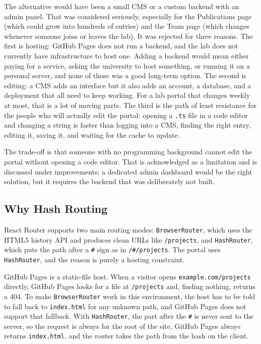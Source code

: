 The alternative would have been a small CMS or a custom backend with an admin panel. That was considered seriously, especially for the Publications page (which could grow into hundreds of entries) and the Team page (which changes whenever someone joins or leaves the lab). It was rejected for three reasons. The first is hosting: GitHub Pages does not run a backend, and the lab does not currently have infrastructure to host one. Adding a backend would mean either paying for a service, asking the university to host something, or running it on a personal server, and none of those was a good long-term option. The second is editing: a CMS adds an interface but it also adds an account, a database, and a deployment that all need to keep working. For a lab portal that changes weekly at most, that is a lot of moving parts. The third is the path of least resistance for the people who will actually edit the portal: opening a \texttt{.ts} file in a code editor and changing a string is faster than logging into a CMS, finding the right entry, editing it, saving it, and waiting for the cache to update.

The trade-off is that someone with no programming background cannot edit the portal without opening a code editor. That is acknowledged as a limitation and is discussed under improvements; a dedicated admin dashboard would be the right solution, but it requires the backend that was deliberately not built.

\subsection{Why Hash Routing}\label{subsec:dev-design-routing}

React Router supports two main routing modes: \texttt{BrowserRouter}, which uses the HTML5 history API and produces clean URLs like \texttt{/projects}, and \texttt{HashRouter}, which puts the path after a \texttt{\#} sign as in \texttt{/\#/projects}. The portal uses \texttt{HashRouter}, and the reason is purely a hosting constraint.

GitHub Pages is a static-file host. When a visitor opens \texttt{example.com/projects} directly, GitHub Pages looks for a file at \texttt{/projects} and, finding nothing, returns a 404. To make \texttt{BrowserRouter} work in this environment, the host has to be told to fall back to \texttt{index.html} for any unknown path, and GitHub Pages does not support that fallback. With \texttt{HashRouter}, the part after the \texttt{\#} is never sent to the server, so the request is always for the root of the site, GitHub Pages always returns \texttt{index.html}, and the router takes the path from the hash on the client.

